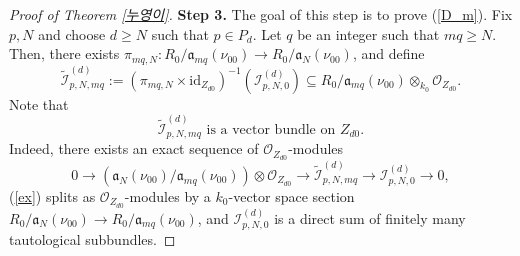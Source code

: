 \documentclass[a4paper,12pt]{amsart}
\theoremstyle{definition} %
\theoremstyle{remark}
\numberwithin{equation}{section}
\begin{document}
\begin{proof}[Proof of Theorem \ref{누영이}]
\smallskip

\noindent \textbf{Step 3.} The goal of this step is to prove (\ref{D_m}). Fix $p,N$ and choose $d\ge N$ such that $p\in P_d$. Let $q$ be an integer such that $mq\ge N$. Then, there exists $\pi_{mq,N}:R_{0}/\mathfrak{a}_{mq}(\nu_{00})\to R_{0}/\mathfrak{a}_N(\nu_{00})$, and define
$$ \tilde{\mathcal{I}}^{(d)}_{p,N,mq}:=(\pi_{mq,N}\times \mathrm{id}_{Z_{d0}})^{-1}(\mathcal{I}^{(d)}_{p,N,0})\subseteq R_{0}/\mathfrak{a}_{mq}(\nu_{00})\otimes_{k_0}\mathcal{O}_{Z_{d0}}.$$
Note that
\begin{equation} \label{vector}
\tilde{\mathcal{I}}^{(d)}_{p,N,mq}\text{ is a vector bundle on }Z_{d0}.
\end{equation}
Indeed, there exists an exact sequence of $\mathcal{O}_{Z_{d0}}$-modules
\begin{equation} \label{ex}
0\to (\mathfrak{a}_N(\nu_{00})/\mathfrak{a}_{mq}(\nu_{00}))\otimes \mathcal{O}_{Z_{d0}}\to \tilde{\mathcal{I}}^{(d)}_{p,N,mq}\to \mathcal{I}^{(d)}_{p,N,0}\to 0,
\end{equation}
(\ref{ex}) splits as $\mathcal{O}_{Z_{d0}}$-modules by a $k_0$-vector space section $R_{0}/\mathfrak{a}_{N}(\nu_{00})\to R_{0}/\mathfrak{a}_{mq}(\nu_{00})$, and $\mathcal{I}^{(d)}_{p,N,0}$ is a direct sum of finitely many tautological subbundles.


\smallskip


\end{proof}
\end{document}
